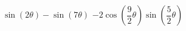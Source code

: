 {$\sin(2\theta) - \sin(7\theta)$}
{$-2\cos \left( \dfrac{9}{2}\theta \right) \sin \left( \dfrac{5}{2}\theta \right)$}
